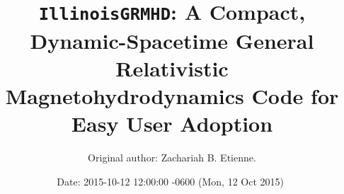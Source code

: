 \documentclass{article}
\begin{document}
\title{{\tt IllinoisGRMHD}: A Compact, Dynamic-Spacetime General Relativistic Magnetohydrodynamics Code for Easy User Adoption}

\author{Original author: Zachariah B. Etienne. }

\date{$ $Date: 2015-10-12 12:00:00 -0600 (Mon, 12 Oct 2015) $ $}
\maketitle

%
%  
%                                                    
\end{document}
